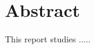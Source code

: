 \newpage
\thispagestyle{empty}
\section*{\centering \small Abstract}
\hspace*{0.75cm} This report studies .....
